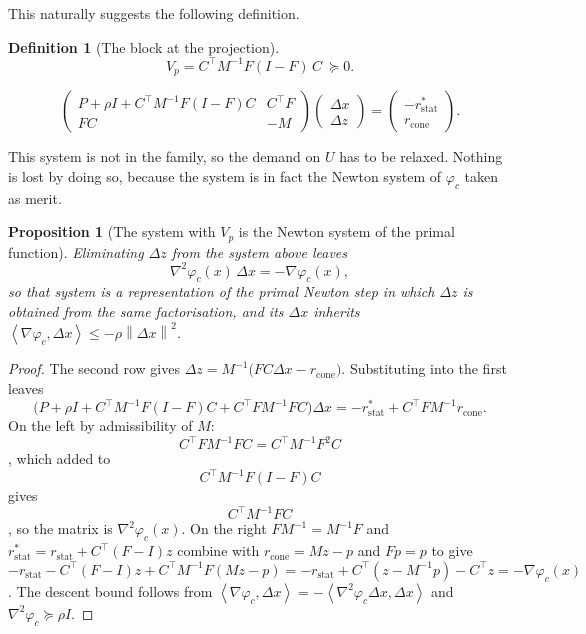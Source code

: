 \documentclass[a4paper,11pt]{book}
\theoremstyle{plain}
\newtheorem{proposition}[theorem]{Proposition}
\theoremstyle{definition}
\newtheorem{definition}[theorem]{Definition}
\theoremstyle{remark}
\numberwithin{equation}{chapter}
\numberwithin{algorithm}{chapter}
\newcommand{\norm}[1]{\left\|#1\right\|}
\newcommand{\inner}[2]{\left\langle #1, #2 \right\rangle}
\begin{document}
	
	
	This naturally suggests the following definition.
	\begin{definition}[The block at the projection]
		\begin{equation}
			V_p=C^\top M^{-1}F(I-F)\,C\ \succeq0 .
		\end{equation}
	\end{definition}
	
	\begin{equation}
		\begin{pmatrix}
			P+\rho I+C^\top M^{-1}F(I-F)C & C^\top F\\[1mm]
			FC & -M
		\end{pmatrix}
		\begin{pmatrix}\Delta x\\ \Delta z\end{pmatrix}
		=\begin{pmatrix}-r^{*}_{\mathrm{stat}}\\ r_{\mathrm{cone}}\end{pmatrix} .
	\end{equation}
	
	
	This system is not in the family, so the demand on $U$ has to be relaxed.
	Nothing is lost by doing so, because the system is in fact the Newton system of
	$\varphi_c$ taken as merit.
	\begin{proposition}[The system with $V_p$ is the Newton system of the primal function]
		Eliminating $\Delta z$ from the system above leaves
		\begin{equation}
			\nabla^2\varphi_c(x)\,\Delta x=-\nabla\varphi_c(x) ,
		\end{equation}
		so that system is a representation of the primal Newton step in which $\Delta z$
		is obtained from the same factorisation, and its $\Delta x$ inherits
		$\inner{\nabla\varphi_c}{\Delta x}\leq-\rho\norm{\Delta x}^2$.
	\end{proposition}
	
	\begin{proof}
		The second row gives $\Delta z=M^{-1}\bigl(FC\Delta x-r_{\mathrm{cone}}\bigr)$.
		Substituting into the first leaves
		\[
		\bigl(P+\rho I+C^\top M^{-1}F(I-F)C+C^\top FM^{-1}FC\bigr)\Delta x
		=-r^{*}_{\mathrm{stat}}+C^\top FM^{-1}r_{\mathrm{cone}} .
		\]
		On the left by admissibility of $M$: $$C^\top FM^{-1}FC=C^\top M^{-1}F^2C$$, which added to
		$$C^\top M^{-1}F(I-F)C$$ gives $$C^\top M^{-1}FC$$, so the matrix is
		$ \nabla^2\varphi_c(x)$. On the right $FM^{-1}=M^{-1}F$ and
		$r^{*}_{\mathrm{stat}}=r_{\mathrm{stat}}+C^\top(F-I)z$ combine with
		$r_{\mathrm{cone}}=Mz-p$ and $Fp=p$ to give
		$$-r_{\mathrm{stat}}-C^\top(F-I)z+C^\top M^{-1}F(Mz-p)
		=-r_{\mathrm{stat}}+C^\top(z-M^{-1}p)-C^\top z
		=-\nabla\varphi_c(x)$$. The descent bound follows from
		$\inner{\nabla\varphi_c}{\Delta x}
		=-\inner{\nabla^2\varphi_c\Delta x}{\Delta x}$ and
		$\nabla^2\varphi_c\succeq\rho I$.
	\end{proof}
	
\end{document}
